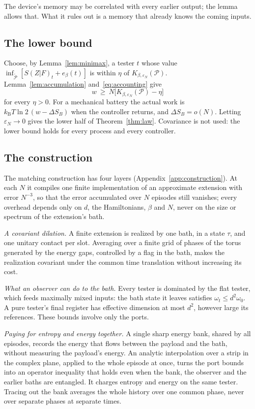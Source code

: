 \documentclass[11pt]{article}
\theoremstyle{definition}
\theoremstyle{remark}
\newcommand{\kB}{k_{\mathrm B}}
\newcommand{\Pp}{\mathcal P}
\newcommand{\Pt}{\widetilde{\mathcal P}}
\begin{document}
The device's memory may be correlated with every earlier output; the lemma allows that. What it rules out is a memory that already knows the coming inputs.

\subsection{The lower bound}

Choose, by Lemma~\ref{lem:minimax}, a tester $t$ whose value $\inf_{\Pt}[S(Z|F)_t+e_\beta(t)]$ is within $\eta$ of $K_{\beta,\varepsilon_N}(\Pp)$. Lemma~\ref{lem:accumulation} and~\eqref{eq:accounting} give
\begin{equation}\label{eq:converse}
w\ \ge\ N\bigl[K_{\beta,\varepsilon_N}(\Pp)-\eta\bigr]
\end{equation}
for every $\eta>0$. For a mechanical battery the actual work is $\kB T\ln2\,(w-\Delta S_B)$ when the controller returns, and $\Delta S_B=o(N)$. Letting $\varepsilon_N\to0$ gives the lower half of Theorem~\ref{thm:law}. Covariance is not used: the lower bound holds for every process and every controller.

\subsection{The construction}\label{sec:construction}

The matching construction has four layers (Appendix~\ref{app:construction}). At each $N$ it compiles one finite implementation of an approximate extension with error $N^{-3}$, so that the error accumulated over $N$ episodes still vanishes; every overhead depends only on $d$, the Hamiltonians, $\beta$ and $N$, never on the size or spectrum of the extension's bath.

\emph{A covariant dilation.} A finite extension is realized by one bath, in a state $\tau$, and one unitary contact per slot. Averaging over a finite grid of phases of the torus generated by the energy gaps, controlled by a flag in the bath, makes the realization covariant under the common time translation without increasing its cost.

\emph{What an observer can do to the bath.} Every tester is dominated by the flat tester, which feeds maximally mixed inputs: the bath state it leaves satisfies $\omega_t\le d^2\omega_0$. A pure tester's final register has effective dimension at most $d^2$, however large its references. These bounds involve only the ports.

\emph{Paying for entropy and energy together.} A single sharp energy bank, shared by all episodes, records the energy that flows between the payload and the bath, without measuring the payload's energy. An analytic interpolation over a strip in the complex plane, applied to the whole episode at once, turns the port bounds into an operator inequality that holds even when the bank, the observer and the earlier baths are entangled. It charges entropy and energy on the same tester. Tracing out the bank averages the whole history over one common phase, never over separate phases at separate times.
\end{document}
